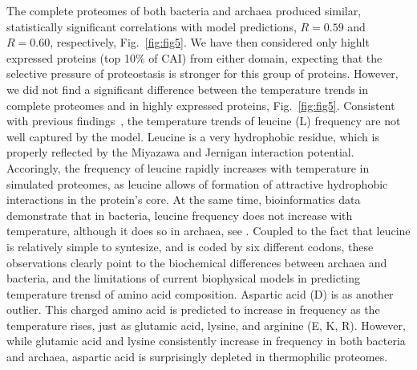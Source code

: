 \documentclass[10pt,letterpaper]{article}
\begin{document}
The complete proteomes of both bacteria and archaea produced similar, statistically significant correlations with model predictions, $R=0.59$ and $R=0.60$, respectively, Fig.~\ref{fig:fig5}. We have then considered only highlt expressed proteins (top 10\% of CAI) from either domain, expecting that the selective pressure of proteostasis is stronger for this group of proteins. However, we did not find a significant difference between the temperature trends in complete proteomes and in highly expressed proteins, Fig.~\ref{fig:fig5}.  Consistent with previous findings~\cite{Venev2015Massively}, the temperature trends of leucine (L) frequency are not well captured by the model. Leucine is a very hydrophobic residue, which is properly reflected by the Miyazawa and Jernigan interaction potential. Accoringly, the frequency of leucine rapidly increases with temperature in simulated proteomes, as leucine allows of formation of attractive hydrophobic interactions in the protein's core. At the same time, bioinformatics data demonstrate that in bacteria, leucine frequency does not increase with temperature, although it does so in archaea, see . Coupled to the fact that leucine is relatively simple to syntesize, and is coded by six different codons, these observations clearly point to the biochemical differences between archaea and bacteria, and the limitations of current biophysical models in predicting temperature trensd of amino acid composition. Aspartic acid (D) is as another outlier. This charged amino acid is predicted to increase in frequency as the temperature rises, just as glutamic acid, lysine, and arginine (E, K, R). However, while glutamic acid and lysine consistently increase in frequency in both bacteria and archaea, aspartic acid is surprisingly depleted in thermophilic proteomes.

   

       
\end{document}
